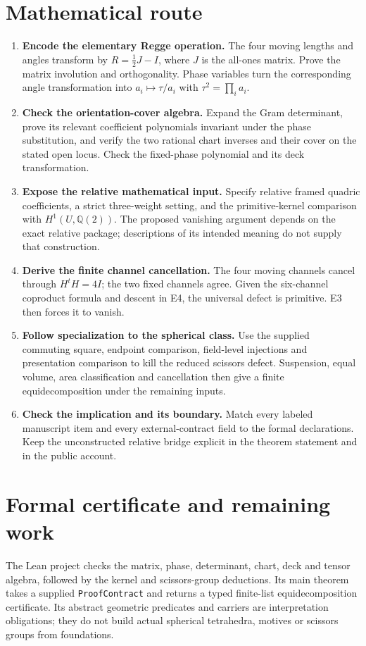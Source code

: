 \documentclass[11pt]{article}
\begin{document}
\section*{Mathematical route}
\begin{enumerate}
\item \textbf{Encode the elementary Regge operation.}
  The four moving lengths and angles transform by
  $R=\tfrac12J-I$, where $J$ is the all-ones matrix. Prove the matrix
  involution and orthogonality. Phase variables turn the corresponding
  angle transformation into $a_i\mapsto\tau/a_i$ with
  $\tau^2=\prod_i a_i$.
\item \textbf{Check the orientation-cover algebra.}
  Expand the Gram determinant, prove its relevant coefficient
  polynomials invariant under the phase substitution, and verify the
  two rational chart inverses and their cover on the stated open locus.
  Check the fixed-phase polynomial and its deck transformation.
\item \textbf{Expose the relative mathematical input.}
  Specify relative framed quadric coefficients, a strict three-weight
  setting, and the primitive-kernel comparison with
  $H^1(U,\mathbb Q(2))$. The proposed vanishing argument depends on
  the exact relative package; descriptions of its intended meaning do
  not supply that construction.
\item \textbf{Derive the finite channel cancellation.}
  The four moving channels cancel through $H^tH=4I$; the two fixed
  channels agree. Given the six-channel coproduct formula and descent
  in E4, the universal defect is primitive. E3 then forces it to vanish.
\item \textbf{Follow specialization to the spherical class.}
  Use the supplied commuting square, endpoint comparison, field-level
  injections and presentation comparison to kill the reduced scissors
  defect. Suspension, equal volume, area classification and cancellation
  then give a finite equidecomposition under the remaining inputs.
\item \textbf{Check the implication and its boundary.}
  Match every labeled manuscript item and every external-contract field
  to the formal declarations. Keep the unconstructed relative bridge
  explicit in the theorem statement and in the public account.
\end{enumerate}

\section*{Formal certificate and remaining work}
The Lean project checks the matrix, phase, determinant, chart, deck and
tensor algebra, followed by the kernel and scissors-group deductions. Its
main theorem takes a supplied \texttt{ProofContract} and returns a typed
finite-list equidecomposition certificate. Its abstract geometric
predicates and carriers are interpretation obligations; they do not build
actual spherical tetrahedra, motives or scissors groups from foundations.
\end{document}
